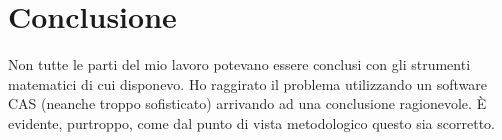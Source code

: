 \documentclass[dvips]{article}
\begin{document}
\section{Conclusione}
Non tutte le parti del mio lavoro potevano essere conclusi con gli strumenti matematici di cui disponevo. Ho raggirato il problema utilizzando un software CAS (neanche troppo sofisticato) arrivando ad una conclusione ragionevole. È evidente, purtroppo, come dal punto di vista metodologico questo sia scorretto. 
\end{document}
